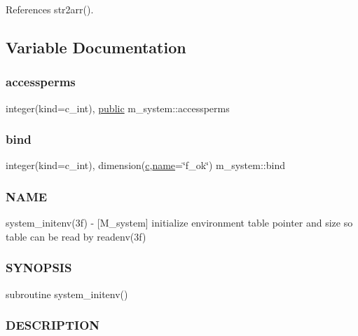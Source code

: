 References str2arr().



\subsection{Variable Documentation}
\mbox{\label{namespacem__system_aebf870d5d43a6bd77ae469c795008109}} 
\subsubsection{\texorpdfstring{accessperms}{accessperms}}
{\footnotesize\ttfamily integer(kind=c\+\_\+int), \hyperlink{M__stopwatch_83_8txt_a2f74811300c361e53b430611a7d1769f}{public} m\+\_\+system\+::accessperms}

\mbox{\label{namespacem__system_afe662f3eb5605285a495404491087190}} 
\subsubsection{\texorpdfstring{bind}{bind}}
{\footnotesize\ttfamily integer(kind=c\+\_\+int), dimension(\hyperlink{c_8f90_aeb1f4e639be0213b4cbd07f2583a5b1f}{c},\hyperlink{M__stopwatch_83_8txt_a3f508a893ae4c3b397b4383e33b9bcae}{name}=\char`\"{}f\+\_\+ok\char`\"{}) m\+\_\+system\+::bind\hspace{0.3cm}{\ttfamily [private]}}



\subsubsection*{N\+A\+ME}

system\+\_\+initenv(3f) -\/ \mbox{[}M\+\_\+system\mbox{]} initialize environment table pointer and size so table can be read by readenv(3f) \subsubsection*{S\+Y\+N\+O\+P\+S\+IS}

subroutine system\+\_\+initenv() \subsubsection*{D\+E\+S\+C\+R\+I\+P\+T\+I\+ON}

